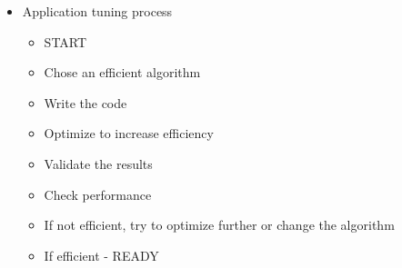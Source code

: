 \documentclass[paper=a4, fontsize=11pt]{scrartcl} %
\numberwithin{equation}{section} %
\numberwithin{figure}{section} %
\numberwithin{table}{section} %
\begin{document}
\begin{itemize}
  \item Application tuning process
  \begin{itemize}
    \item START
    \item Chose an efficient algorithm
    \item Write the code
    \item Optimize to increase efficiency
    \item Validate the results
    \item Check performance
    \item If not efficient, try to optimize further or change the algorithm
    \item If efficient - READY
  \end{itemize}
\end{itemize}
\end{document}
